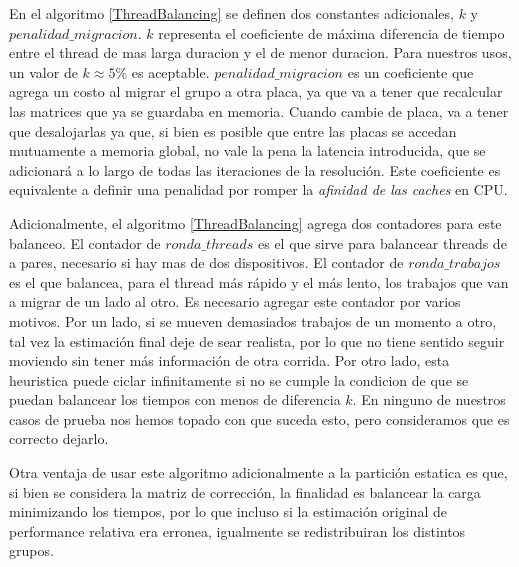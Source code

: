 En el algoritmo \ref{ThreadBalancing} se definen dos constantes adicionales, $k$ y $penalidad\_migracion$.
$k$ representa el coeficiente de m\'axima diferencia de tiempo entre el thread de mas larga duracion y el de menor
duracion. Para nuestros usos, un valor de $k \approx 5\%$ es aceptable.
$penalidad\_migracion$ es un coeficiente que agrega un costo al migrar el grupo a otra placa, ya que va
a tener que recalcular las matrices que ya se guardaba en memoria. Cuando cambie de placa, va a tener
que desalojarlas ya que, si bien es posible que entre las placas se accedan mutuamente a memoria global,
no vale la pena la latencia introducida, que se adicionar\'a a lo largo de todas las iteraciones de la resoluci\'on.
Este coeficiente es equivalente a definir una penalidad por romper la \textit{afinidad de las caches} en CPU.

Adicionalmente, el algoritmo \ref{ThreadBalancing} agrega dos contadores para este balanceo. El contador de
$ronda\_threads$ es el que sirve para balancear threads de a pares, necesario si hay mas de dos dispositivos.
El contador de $ronda\_trabajos$ es el que balancea, para el thread m\'as r\'apido y el m\'as lento, los
trabajos que van a migrar de un lado al otro. Es necesario agregar este contador por varios motivos. Por
un lado, si se mueven demasiados trabajos de un momento a otro, tal vez la estimaci\'on final deje de sear realista,
por lo que no tiene sentido seguir moviendo sin tener m\'as informaci\'on de otra corrida. Por otro lado, esta
heuristica puede ciclar infinitamente si no se cumple la condicion de que se puedan balancear los tiempos
con menos de diferencia $k$. En ninguno de nuestros casos de prueba nos hemos topado con que suceda esto, pero
consideramos que es correcto dejarlo.

Otra ventaja de usar este algoritmo adicionalmente a la partici\'on estatica es que, si bien se considera la matriz
de correcci\'on, la finalidad es balancear la carga minimizando los tiempos, por lo que incluso si la estimaci\'on original
de performance relativa era erronea, igualmente se redistribuiran los distintos grupos.


